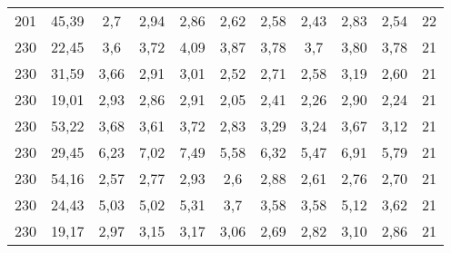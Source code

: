 \begin{table}[!ht]
\begin{tabular}{c c c c c c c c c c c}
                    201 & 45,39 &                       2,7 &                      2,94 &                      2,86 &                2,62 &                2,58 &                2,43 &                                               2,83 &       2,54 &                 22 \\
                    230 & 22,45 &                       3,6 &                      3,72 &                      4,09 &                3,87 &                3,78 &                 3,7 &                                               3,80 &       3,78 &                 21 \\
                    230 & 31,59 &                      3,66 &                      2,91 &                      3,01 &                2,52 &                2,71 &                2,58 &                                               3,19 &       2,60 &                 21 \\
                    230 & 19,01 &                      2,93 &                      2,86 &                      2,91 &                2,05 &                2,41 &                2,26 &                                               2,90 &       2,24 &                 21 \\
                    230 & 53,22 &                      3,68 &                      3,61 &                      3,72 &                2,83 &                3,29 &                3,24 &                                               3,67 &       3,12 &                 21 \\
                    230 & 29,45 &                      6,23 &                      7,02 &                      7,49 &                5,58 &                6,32 &                5,47 &                                               6,91 &       5,79 &                 21 \\
                    230 & 54,16 &                      2,57 &                      2,77 &                      2,93 &                 2,6 &                2,88 &                2,61 &                                               2,76 &       2,70 &                 21 \\
                    230 & 24,43 &                      5,03 &                      5,02 &                      5,31 &                 3,7 &                3,58 &                3,58 &                                               5,12 &       3,62 &                 21 \\
                    230 & 19,17 &                      2,97 &                      3,15 &                      3,17 &                3,06 &                2,69 &                2,82 &                                               3,10 &       2,86 &                 21 \\

\end{tabular}
\end{table}
